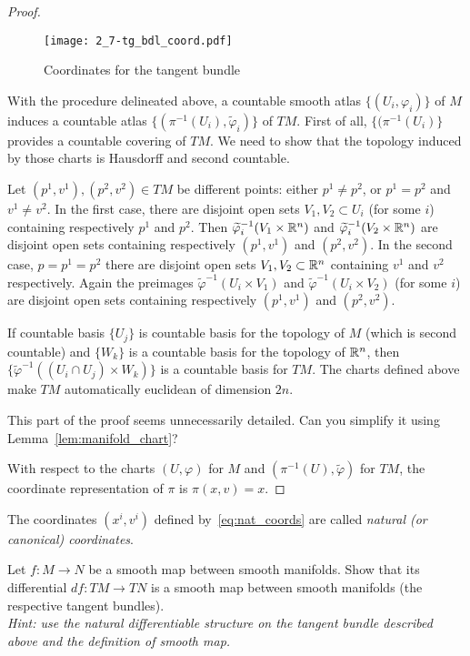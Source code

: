 \begin{proof}
  \begin{figure*}[htp]
    \texttt{[image: 2\_7-tg\_bdl\_coord.pdf]}
    \caption{Coordinates for the tangent bundle}
  \end{figure*}
  
  With the procedure delineated above, a countable smooth atlas $\{(U_i, \varphi_i)\}$ of $M$ induces a countable atlas $\{(\pi^{-1}(U_i), \widetilde\varphi_i)\}$ of $TM$.
  First of all, $\{(\pi^{-1}(U_i)\}$ provides a countable covering of $TM$.
  We need to show that the topology induced by those charts is Hausdorff and second countable.
  
  Let $(p^1, v^1), (p^2, v^2) \in TM$ be different points: either $p^1\neq p^2$, or $p^1 = p^2$ and $v^1 \neq v^2$.
  In the first case, there are disjoint open sets $V_1, V_2 \subset U_i$ (for some $i$) containing respectively $p^1$ and $p^2$.
  Then $\widetilde\varphi_i^{-1}(V_1\times\mathbb{R}^n)$ and $\widetilde\varphi_i^{-1}(V_2\times\mathbb{R}^n)$ are disjoint open sets containing respectively $(p^1, v^1)$ and $(p^2, v^2)$.
  In the second case, $p=p^1=p^2$ there are disjoint open sets $V_1,V_2\subset \mathbb{R}^n$ containing $v^1$ and $v^2$ respectively.
  Again the preimages $\widetilde\varphi^{-1}(U_i\times V_1)$ and $\widetilde\varphi^{-1}(U_i\times V_2)$ (for some $i$) are disjoint open sets containing respectively $(p^1, v^1)$ and $(p^2, v^2)$.

  If countable basis $\{U_j\}$ is countable basis for the topology of $M$ (which is second countable) and $\{W_k\}$ is a countable basis for the topology of $\mathbb{R}^n$, then $\{\widetilde\varphi^{-1}((U_i\cap U_j)\times W_k)\}$ is a countable basis for $TM$.
  The charts defined above make $TM$ automatically euclidean of dimension $2n$.

  \begin{exercise}
    This part of the proof seems unnecessarily detailed.
    Can you simplify it using Lemma~\ref{lem:manifold_chart}?
  \end{exercise}

   With respect to the charts $(U,\varphi)$ for $M$ and $(\pi^{-1}(U), \widetilde\varphi)$ for $TM$, the coordinate representation of $\pi$ is $\pi(x,v) = x$.
\end{proof}

The coordinates $(x^i, v^i)$ defined by~\eqref{eq:nat_coords} are called \emph{natural (or canonical) coordinates}.

\begin{exercise}
  Let $f:M\to N$ be a smooth map between smooth manifolds.
  Show that its differential $df: TM \to TN$ is a smooth map between smooth manifolds (the respective tangent bundles).\\
  \textit{\small Hint: use the natural differentiable structure on the tangent bundle described above and the definition of smooth map.}
\end{exercise}

